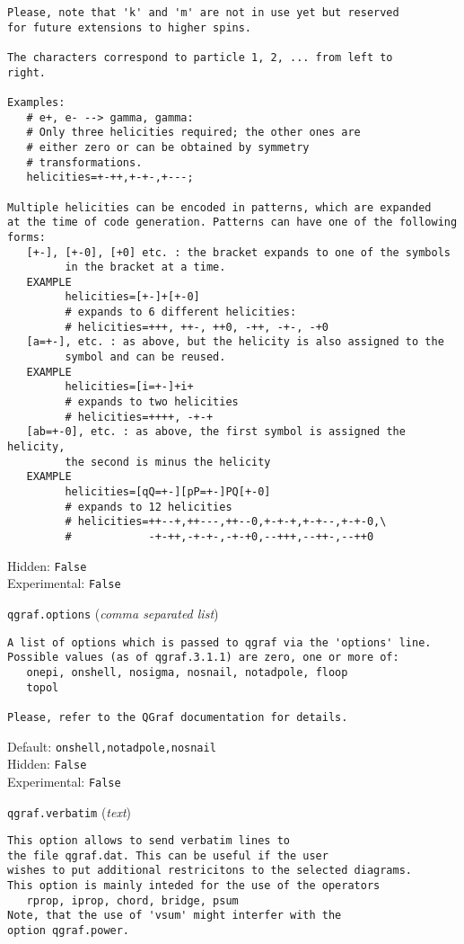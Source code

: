 \begin{basedescript}{\desclabelstyle{\pushlabel}}
\begin{verbatim}
Please, note that 'k' and 'm' are not in use yet but reserved
for future extensions to higher spins.

The characters correspond to particle 1, 2, ... from left to
right.

Examples:
   # e+, e- --> gamma, gamma:
   # Only three helicities required; the other ones are
   # either zero or can be obtained by symmetry
   # transformations.
   helicities=+-++,+-+-,+---;

Multiple helicities can be encoded in patterns, which are expanded
at the time of code generation. Patterns can have one of the following
forms:
   [+-], [+-0], [+0] etc. : the bracket expands to one of the symbols
         in the bracket at a time.
   EXAMPLE
         helicities=[+-]+[+-0]
         # expands to 6 different helicities:
         # helicities=+++, ++-, ++0, -++, -+-, -+0
   [a=+-], etc. : as above, but the helicity is also assigned to the
         symbol and can be reused.
   EXAMPLE
         helicities=[i=+-]+i+
         # expands to two helicities
         # helicities=++++, -+-+
   [ab=+-0], etc. : as above, the first symbol is assigned the helicity,
         the second is minus the helicity
   EXAMPLE
         helicities=[qQ=+-][pP=+-]PQ[+-0]
         # expands to 12 helicities
         # helicities=++--+,++---,++--0,+-+-+,+-+--,+-+-0,\
         #            -+-++,-+-+-,-+-+0,--+++,--++-,--++0
\end{verbatim}
Hidden: \verb|False|
\\Experimental: \verb|False|
\\\item[\colorbox{gray!30}{\texttt{qgraf.options}}] (\textit{comma separated list})
\begin{verbatim}
A list of options which is passed to qgraf via the 'options' line.
Possible values (as of qgraf.3.1.1) are zero, one or more of:
   onepi, onshell, nosigma, nosnail, notadpole, floop
   topol

Please, refer to the QGraf documentation for details.
\end{verbatim}
Default: \verb|onshell,notadpole,nosnail|
\\Hidden: \verb|False|
\\Experimental: \verb|False|
\\\item[\colorbox{gray!30}{\texttt{qgraf.verbatim}}] (\textit{text})
\begin{verbatim}
This option allows to send verbatim lines to
the file qgraf.dat. This can be useful if the user
wishes to put additional restricitons to the selected diagrams.
This option is mainly inteded for the use of the operators
   rprop, iprop, chord, bridge, psum
Note, that the use of 'vsum' might interfer with the
option qgraf.power.


\end{verbatim}
\end{basedescript}
